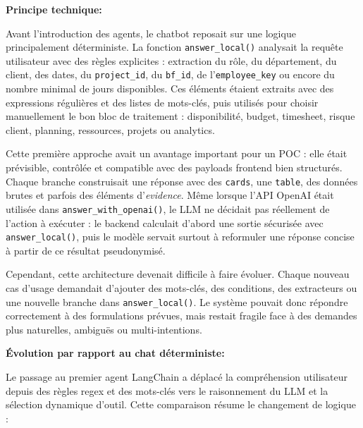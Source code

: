 \documentclass[a4paper,11pt,english,openany]{book}
\begin{document}
\textbf{Principe technique:}

Avant l'introduction des agents, le chatbot reposait sur une logique principalement déterministe. La fonction \texttt{answer\_local()} analysait la requête utilisateur avec des règles explicites : extraction du rôle, du département, du client, des dates, du \texttt{project\_id}, du \texttt{bf\_id}, de l'\texttt{employee\_key} ou encore du nombre minimal de jours disponibles. Ces éléments étaient extraits avec des expressions régulières et des listes de mots-clés, puis utilisés pour choisir manuellement le bon bloc de traitement : disponibilité, budget, timesheet, risque client, planning, ressources, projets ou analytics.

Cette première approche avait un avantage important pour un POC : elle était prévisible, contrôlée et compatible avec des payloads frontend bien structurés. Chaque branche construisait une réponse avec des \texttt{cards}, une \texttt{table}, des données brutes et parfois des éléments d'\textit{evidence}. Même lorsque l'API OpenAI était utilisée dans \texttt{answer\_with\_openai()}, le LLM ne décidait pas réellement de l'action à exécuter : le backend calculait d'abord une sortie sécurisée avec \texttt{answer\_local()}, puis le modèle servait surtout à reformuler une réponse concise à partir de ce résultat pseudonymisé.

Cependant, cette architecture devenait difficile à faire évoluer. Chaque nouveau cas d'usage demandait d'ajouter des mots-clés, des conditions, des extracteurs ou une nouvelle branche dans \texttt{answer\_local()}. Le système pouvait donc répondre correctement à des formulations prévues, mais restait fragile face à des demandes plus naturelles, ambiguës ou multi-intentions.

\newpage

\textbf{Évolution par rapport au chat déterministe:}

Le passage au premier agent LangChain a déplacé la compréhension utilisateur depuis des règles regex et des mots-clés vers le raisonnement du LLM et la sélection dynamique d'outil. Cette comparaison résume le changement de logique :
\end{document}
